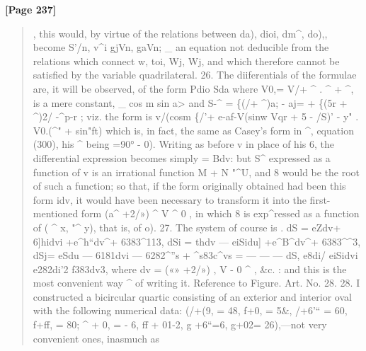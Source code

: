 \documentclass[11pt,a4paper]{book}
\begin{document}
\textbf{[Page 237]}\\[0.2cm]
\begin{quote}
,
this would, by virtue of the relations between da), dioi, dm\textasciicircum{}, do),, become
S'/n, v\textasciicircum{}i gjVn, gaVn; \_
an equation not deducible from the relations which connect w, toi, Wj, Wj, and which
therefore cannot be satisfied by the variable quadrilateral.
26. The diiferentials of the formulae are, it will be observed, of the form Pdio
Sda
where V0,= V/+ \textasciicircum{} . \textasciicircum{} + \textasciicircum{}, is a mere constant,
\_ cos m sin a>
and
S-\textasciicircum{} = \{(/+ \textasciicircum{})a; - aj= + \{(5r + \textasciicircum{})2/ -\textasciicircum{}p-r ;
viz. the form is
v/(cosm \{/'+ e-af-V(sinw Vqr + 5 - /S)' - y" .
V0.(\textasciicircum{}"
+
sin"ft)
which is, in fact, the same as Casey's form in \textasciicircum{}, equation (300), his \textasciicircum{} being
=90° -
0).
Writing as before v in place of his 6, the differential expression becomes simply
= Bdv: but S\textasciicircum{} expressed as a function of v is an irrational function M + N "\textasciicircum{}U,
and 8 would be the root of such a function; so that, if the form originally obtained
had been this form idv, it would have been necessary to transform it into the first-
mentioned form (a\textasciicircum{} +2/») \textasciicircum{} V \textasciicircum{} 0 , in which 8 is exp\textasciicircum{}ressed as a function of ( \textasciicircum{} x, "\textasciicircum{} y), that
is, of o).
27. The system of course is
.
dS = eZdv+ 6]hidvi +e\textasciicircum{}h``dv\textasciicircum{}+ 6383\textasciicircum{}113,
dSi = thdv --- eiSidu] +e\textasciicircum{}B\textasciicircum{}dv\textasciicircum{}+ 6383\textasciicircum{}\textasciicircum{}3,
dSj= eSdu --- 6181dvi --- 6282\textasciicircum{}''s + \textasciicircum{}s83c\textasciicircum{}vs
= --- --- ---
dS, e8di/ eiSidvi e282di'2 f383dv3,
where dv = («» +2/») , V - 0 \textasciicircum{} , \&c. : and this is the most convenient way \textasciicircum{} of writing it.
Reference to Figure. Art. No. 28.
28. I constructed a bicircular quartic consisting of an exterior and interior oval
with the following numerical data: (/+(9, = 48, f+0, = 5\&, /+6'`` = 60, f+ff, = 80;
\textasciicircum{} + 0, = - 6, ff + 01-2, g +6``=6, g+02= 26),---not very convenient ones, inasmuch as
\end{quote}
\end{document}
